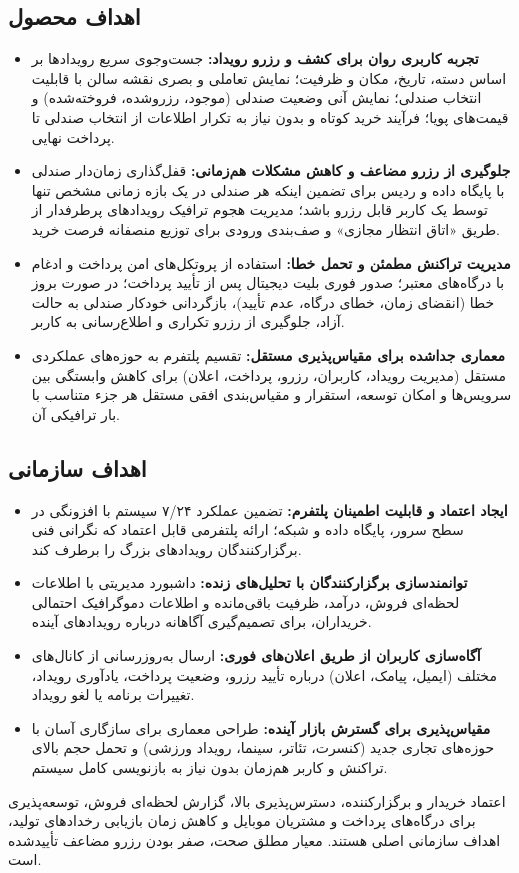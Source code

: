 \documentclass[12pt,a4paper]{article}
\begin{document}
\subsection{اهداف محصول}
\begin{itemize}
  \item \textbf{تجربه کاربری روان برای کشف و رزرو رویداد:} جست‌وجوی سریع
  رویدادها بر اساس دسته، تاریخ، مکان و ظرفیت؛ نمایش تعاملی و بصری نقشه سالن با
  قابلیت انتخاب صندلی؛ نمایش آنی وضعیت صندلی (موجود، رزروشده، فروخته‌شده) و
  قیمت‌های پویا؛ فرآیند خرید کوتاه و بدون نیاز به تکرار اطلاعات از انتخاب صندلی
  تا پرداخت نهایی.
  \item \textbf{جلوگیری از رزرو مضاعف و کاهش مشکلات هم‌زمانی:} قفل‌گذاری
  زمان‌دار صندلی با پایگاه داده و ردیس برای تضمین اینکه هر صندلی در یک بازه
  زمانی مشخص تنها توسط یک کاربر قابل رزرو باشد؛ مدیریت هجوم ترافیک رویدادهای
  پرطرفدار از طریق «اتاق انتظار مجازی» و صف‌بندی ورودی برای توزیع منصفانه
  فرصت خرید.
  \item \textbf{مدیریت تراکنش مطمئن و تحمل خطا:} استفاده از پروتکل‌های امن
  پرداخت و ادغام با درگاه‌های معتبر؛ صدور فوری بلیت دیجیتال پس از تأیید
  پرداخت؛ در صورت بروز خطا (انقضای زمان، خطای درگاه، عدم تأیید)، بازگردانی
  خودکار صندلی به حالت آزاد، جلوگیری از رزرو تکراری و اطلاع‌رسانی به کاربر.
  \item \textbf{معماری جداشده برای مقیاس‌پذیری مستقل:} تقسیم پلتفرم به
  حوزه‌های عملکردی مستقل (مدیریت رویداد، کاربران، رزرو، پرداخت، اعلان) برای
  کاهش وابستگی بین سرویس‌ها و امکان توسعه، استقرار و مقیاس‌بندی افقی مستقل هر
  جزء متناسب با بار ترافیکی آن.
\end{itemize}

\subsection{اهداف سازمانی}
\begin{itemize}
  \item \textbf{ایجاد اعتماد و قابلیت اطمینان پلتفرم:} تضمین عملکرد ۷/۲۴
  سیستم با افزونگی در سطح سرور، پایگاه داده و شبکه؛ ارائه پلتفرمی قابل اعتماد
  که نگرانی فنی برگزارکنندگان رویدادهای بزرگ را برطرف کند.
  \item \textbf{توانمندسازی برگزارکنندگان با تحلیل‌های زنده:} داشبورد
  مدیریتی با اطلاعات لحظه‌ای فروش، درآمد، ظرفیت باقی‌مانده و اطلاعات دموگرافیک
  احتمالی خریداران، برای تصمیم‌گیری آگاهانه درباره رویدادهای آینده.
  \item \textbf{آگاه‌سازی کاربران از طریق اعلان‌های فوری:} ارسال به‌روزرسانی
  از کانال‌های مختلف (ایمیل، پیامک، اعلان) درباره تأیید رزرو،
  وضعیت پرداخت، یادآوری رویداد، تغییرات برنامه یا لغو رویداد.
  \item \textbf{مقیاس‌پذیری برای گسترش بازار آینده:} طراحی معماری برای
  سازگاری آسان با حوزه‌های تجاری جدید (کنسرت، تئاتر، سینما، رویداد ورزشی) و
  تحمل حجم بالای تراکنش و کاربر هم‌زمان بدون نیاز به بازنویسی کامل سیستم.
\end{itemize}
اعتماد خریدار و برگزارکننده، دسترس‌پذیری بالا، گزارش لحظه‌ای فروش، توسعه‌پذیری
برای درگاه‌های پرداخت و مشتریان موبایل و کاهش زمان بازیابی رخدادهای تولید،
اهداف سازمانی اصلی هستند. معیار مطلق صحت، صفر بودن رزرو مضاعف تأییدشده است.
\end{document}
